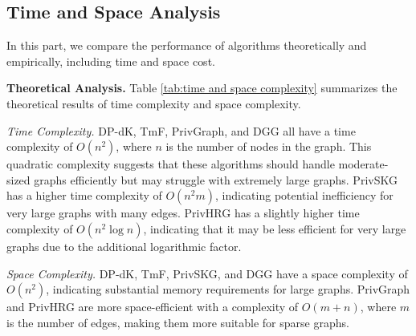 \documentclass[conference]{IEEEtran}
\theoremstyle{plain}
\begin{document}
\begin{table}[t]
\small
   \caption{Comparison of Time and Space Complexity.}
	\label{tab:time and space complexity}
	\centering
\end{table}

\subsection{Time and Space Analysis}
In this part, we compare the performance of algorithms theoretically and empirically, including time and space cost.

\noindent\textbf{Theoretical Analysis.}
Table \ref{tab:time and space complexity} summarizes the theoretical results of time complexity and space complexity.

\textit{Time Complexity.}
DP-dK, TmF, PrivGraph, and DGG all have a time complexity of $O(n^2)$, where $n$ is the number of nodes in the graph. 
This quadratic complexity suggests that these algorithms should handle moderate-sized graphs efficiently but may struggle with extremely large graphs.
PrivSKG has a higher time complexity of $O(n^2m)$, indicating potential inefficiency for very large graphs with many edges.
PrivHRG has a slightly higher time complexity of $O(n^2\log n)$, indicating that it may be less efficient for very large graphs due to the additional logarithmic factor.

\textit{Space Complexity.}
DP-dK, TmF, PrivSKG, and DGG have a space complexity of $O(n^2)$, indicating substantial memory requirements for large graphs.
PrivGraph and PrivHRG are more space-efficient with a complexity of $O(m+n)$, where $m$  is the number of edges, making them more suitable for sparse graphs.
\end{document}
